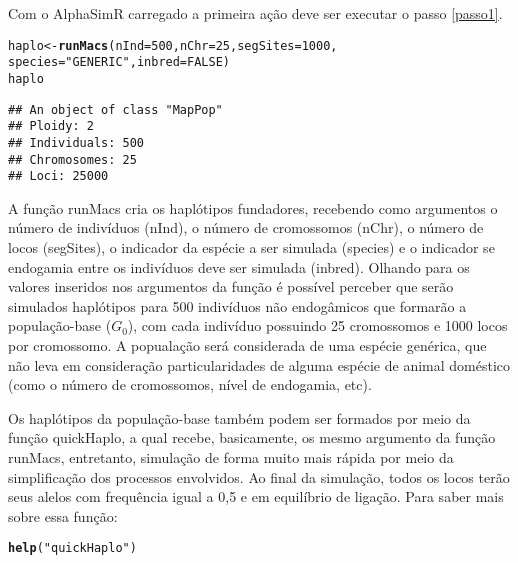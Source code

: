 \documentclass{article}\usepackage[]{graphicx}\usepackage[]{xcolor}
\makeatletter
\newcommand{\hlnum}[1]{\textcolor[rgb]{0.686,0.059,0.569}{#1}}%
\newcommand{\hlstr}[1]{\textcolor[rgb]{0.192,0.494,0.8}{#1}}%
\newcommand{\hlstd}[1]{\textcolor[rgb]{0.345,0.345,0.345}{#1}}%
\newcommand{\hlkwb}[1]{\textcolor[rgb]{0.69,0.353,0.396}{#1}}%
\newcommand{\hlkwc}[1]{\textcolor[rgb]{0.333,0.667,0.333}{#1}}%
\newcommand{\hlkwd}[1]{\textcolor[rgb]{0.737,0.353,0.396}{\textbf{#1}}}%
\newenvironment{kframe}{%
 \def\at@end@of@kframe{}%
 \ifinner\ifhmode%
  \def\at@end@of@kframe{\end{minipage}}%
  \begin{minipage}{\columnwidth}%
 \fi\fi%
 \def\FrameCommand##1{\hskip\@totalleftmargin \hskip-\fboxsep
 \colorbox{shadecolor}{##1}\hskip-\fboxsep
     \hskip-\linewidth \hskip-\@totalleftmargin \hskip\columnwidth}%
 \MakeFramed {\advance\hsize-\width
   \@totalleftmargin\z@ \linewidth\hsize
   \@setminipage}}%
 {\par\unskip\endMakeFramed%
 \at@end@of@kframe}
\newenvironment{knitrout}{}{} %
\makeatother
\begin{document}
Com o AlphaSimR carregado a primeira ação deve ser executar o passo \ref{passo1}.
\begin{knitrout}
\color{fgcolor}\begin{kframe}
\begin{alltt}
\hlstd{haplo}\hlkwb{<-}\hlkwd{runMacs}\hlstd{(}\hlkwc{nInd}\hlstd{=}\hlnum{500}\hlstd{,} \hlkwc{nChr}\hlstd{=}\hlnum{25}\hlstd{,} \hlkwc{segSites}\hlstd{=}\hlnum{1000}\hlstd{,}
               \hlkwc{species}\hlstd{=}\hlstr{"GENERIC"}\hlstd{,} \hlkwc{inbred}\hlstd{=}\hlnum{FALSE}\hlstd{)}
\hlstd{haplo}
\end{alltt}
\begin{verbatim}
## An object of class "MapPop" 
## Ploidy: 2 
## Individuals: 500 
## Chromosomes: 25 
## Loci: 25000
\end{verbatim}
\end{kframe}
\end{knitrout}

A função runMacs cria os haplótipos fundadores, recebendo como argumentos o número de indivíduos (nInd), o número de cromossomos (nChr), o número de locos (segSites), o indicador da espécie a ser simulada (species) e o indicador se endogamia entre os indivíduos deve ser simulada (inbred). Olhando para os valores inseridos nos argumentos da função é possível perceber que serão simulados haplótipos para 500 indivíduos não endogâmicos que formarão a população-base ($G_0$), com cada indivíduo possuindo 25 cromossomos e 1000 locos por cromossomo. A popualação será considerada de uma espécie genérica, que não leva em consideração particularidades de alguma espécie de animal doméstico (como o número de cromossomos, nível de endogamia, etc).

Os haplótipos da população-base também podem ser formados por meio da função quickHaplo, a qual recebe, basicamente, os mesmo argumento da função runMacs, entretanto, simulação de forma muito mais rápida por meio da simplificação dos processos envolvidos. Ao final da simulação, todos os locos terão seus alelos com frequência igual a 0,5 e em equilíbrio de ligação. Para saber mais sobre essa função: 
\begin{knitrout}
\color{fgcolor}\begin{kframe}
\begin{alltt}
\hlkwd{help}\hlstd{(}\hlstr{"quickHaplo"}\hlstd{)}
\end{alltt}
\end{kframe}
\end{knitrout}
\end{document}

